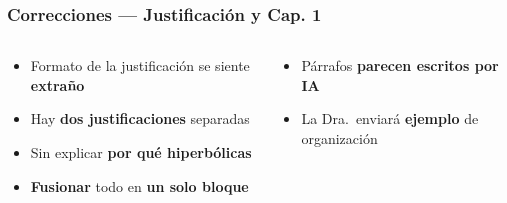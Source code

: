 \documentclass[11pt, aspectratio=169, spanish]{beamer}
\begin{document}
\begin{frame}[plain]
\frametitle{\faLayerGroup\quad Correcciones — Justificación y Cap. 1}
\vspace{0.06cm}

\begin{columns}[T]

\begin{tcolorbox}[colback=NaranjaPend!6, colframe=NaranjaPend!55, arc=2mm,
  title={\footnotesize\textbf{\faExclamationCircle\quad Sobre la Justificación}}]
{\footnotesize
\begin{itemize}[leftmargin=*, itemsep=3pt]
  \item \colorbox{RojoAlerta!15}{\textcolor{RojoAlerta}{}}\; Formato de la justificación se siente \textbf{extraño}
  \item \colorbox{RojoAlerta!15}{\textcolor{RojoAlerta}{}}\; Hay \textbf{dos justificaciones} separadas
  \item \colorbox{RojoAlerta!15}{\textcolor{RojoAlerta}{}}\; Sin explicar \textbf{por qué hiperbólicas}
  \item \colorbox{RojoAlerta!15}{\textcolor{RojoAlerta}{}}\; \textbf{Fusionar} todo en \textbf{un solo bloque}
\end{itemize}}
\end{tcolorbox}

\vspace{0.14cm}

\begin{tcolorbox}[colback=AzulInfo!7, colframe=AzulInfo!50, arc=2mm,
  title={\footnotesize\textbf{\faPen\quad Sobre los Antecedentes}}]
{\footnotesize
\begin{itemize}[leftmargin=*, itemsep=3pt]
  \item \colorbox{RojoAlerta!15}{\textcolor{RojoAlerta}{}}\; Párrafos \textbf{parecen escritos por IA}
  \item \colorbox{RojoAlerta!15}{\textcolor{RojoAlerta}{}}\; La Dra.\ enviará \textbf{ejemplo} de organización
\end{itemize}}
\end{tcolorbox}



\end{columns}
\end{frame}
\end{document}
